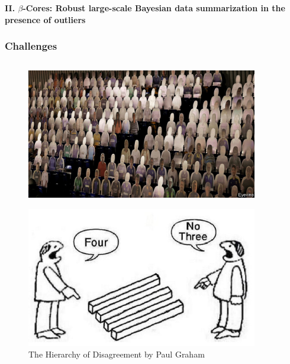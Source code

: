 \documentclass[hyperref={colorlinks = true},unknownkeysallowed]{beamer}
\begin{document}


\begin{frame}
	\LARGE{\textbf{II. $\beta$-Cores: Robust large-scale Bayesian data summarization in the presence of outliers}}
\end{frame}





\begin{frame}[fragile,t]
	\frametitle{Challenges}
	\begin{columns}[onlytextwidth]
		\begin{column}{0.35\textwidth}  %
			\vspace{-1cm} 
			
			\begin{center}
				\begin{figure}
					\includegraphics[width=0.9\textwidth,angle=5]{figs/crowds.jpg}
				\end{figure}
				
				\vspace{-.35cm} 
				
				\begin{figure}
					\includegraphics[width=0.9\textwidth,angle=-5]{figs/Four-No-Three.jpg}
					\caption*{The Hierarchy of Disagreement by Paul Graham}
				\end{figure}
				

\end{center}
\end{column}
\end{columns}
\end{frame}
\end{document}

